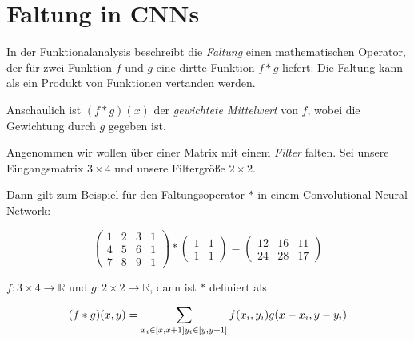 \section{Faltung in CNNs}

In der Funktionalanalysis beschreibt die \emph{Faltung} einen mathematischen Operator, der für zwei Funktion $f$ und $g$ eine dirtte Funktion $f * g$ liefert.
Die Faltung kann als ein Produkt von Funktionen vertanden werden.

Anschaulich ist $(f * g)(x)$ der \emph{gewichtete Mittelwert} von $f$, wobei die Gewichtung durch $g$ gegeben ist.

Angenommen wir wollen über einer Matrix mit einem \emph{Filter} falten.
Sei unsere Eingangsmatrix $3 \times 4$ und unsere Filtergröße $2 \times 2$.

Dann gilt zum Beispiel für den Faltungsoperator $*$ in einem Convolutional Neural Network:

\begin{equation}
  \begin{pmatrix}
    1 & 2 & 3 & 1\\
    4 & 5 & 6 & 1\\
    7 & 8 & 9 & 1
  \end{pmatrix} * \begin{pmatrix}
    1 & 1\\
    1 & 1
  \end{pmatrix} = \begin{pmatrix}
    12 & 16 & 11\\
    24 & 28 & 17
  \end{pmatrix}
\end{equation}

$f: 3 \times 4 \rightarrow \mathbb{R}$ und $g: 2 \times 2 \rightarrow \mathbb{R}$, dann ist $*$ definiert als

\begin{equation}
  (f * g)(x, y) = \sum_{x_i \in [x, x+1]\\y_i \in [y, y+1]} f(x_i, y_i)g(x-x_i, y-y_i)
\end{equation}

